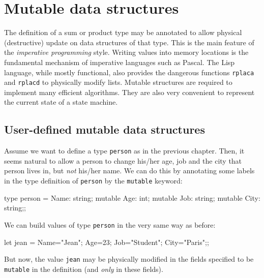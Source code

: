 \chapter{Mutable data structures}
\label{c:mutable}

The definition of a sum or product type may be annotated to allow physical 
(destructive) update on data structures of that type. This is the main 
feature of the {\em imperative programming} style. Writing values into memory locations is the fundamental mechanism of imperative languages 
such as Pascal. The Lisp language, while mostly functional, also provides
the dangerous functions {\tt rplaca} and {\tt rplacd} to
physically modify lists. Mutable structures are required to implement
many efficient algorithms. They are also very convenient to represent
the current state of a state machine.

\section{User-defined mutable data structures}

Assume we want to define a type {\tt person} as in the previous chapter.
Then, it seems natural to allow a person to change his/her age, job and the
city that person lives in, but {\em not} his/her name.
We can do this by annotating some labels in the type definition of
{\tt person} by the {\tt mutable} keyword:
\begin{caml_example}
type person =
    {Name: string; mutable Age: int;
     mutable Job: string; mutable City: string};;
\end{caml_example}
We can build values of type {\tt person} in the very same way as before:
\begin{caml_example}
let jean =
    {Name="Jean"; Age=23; Job="Student"; City="Paris"};;
\end{caml_example}
But now, the value {\tt jean} may be physically modified in the fields
specified to be {\tt mutable} in the definition (and {\em only} in these
fields).


